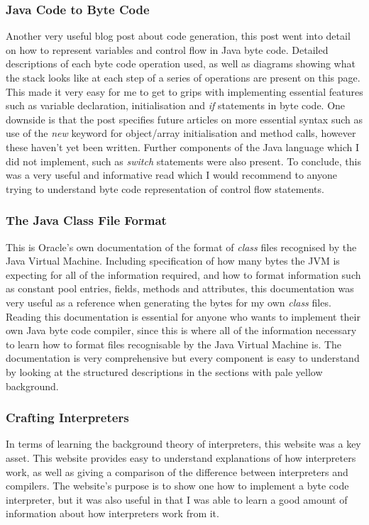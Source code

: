 \documentclass[a4paper, 11pt]{article}
\begin{document}
\subsubsection{Java Code to Byte Code\cite{JavaToByteCode}}
Another very useful blog post about code generation, this post went into detail on how to represent variables and control flow in Java byte code. Detailed descriptions of each byte code operation used, as well as diagrams showing what the stack looks like at each step of a series of operations are present on this page. This made it very easy for me to get to grips with implementing essential features such as variable declaration, initialisation and \textit{if} statements in byte code. One downside is that the post specifies future articles on more essential syntax such as use of the \textit{new} keyword for object/array initialisation and method calls, however these haven't yet been written. Further components of the Java language which I did not implement, such as \textit{switch} statements were also present. To conclude, this was a very useful and informative read which I would recommend to anyone trying to understand byte code representation of control flow statements. 

\subsubsection{The Java Class File Format\cite{ClassFile}}
This is Oracle's own documentation of the format of \textit{class} files recognised by the Java Virtual Machine. Including specification of how many bytes the JVM is expecting for all of the information required, and how to format information such as constant pool entries, fields, methods and attributes, this documentation was very useful as a reference when generating the bytes for my own \textit{class} files. Reading this documentation is essential for anyone who wants to implement their own Java byte code compiler, since this is where all of the information necessary to learn how to format files recognisable by the Java Virtual Machine is. The documentation is very comprehensive but every component is easy to understand by looking at the structured descriptions in the sections with pale yellow background.

\subsubsection{Crafting Interpreters \cite{Crafting Interpreters}}
In terms of learning the background theory of interpreters, this website was a key asset. This website provides easy to understand explanations of how interpreters work, as well as giving a comparison of the difference between interpreters and compilers. The website's purpose is to show one how to implement a byte code interpreter, but it was also useful in that I was able to learn a good amount of information about how interpreters work from it.
\end{document}
